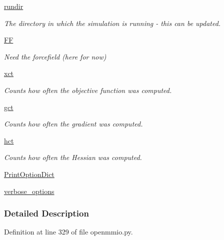 \begin{DoxyCompactItemize}
\hyperlink{classforcebalance_1_1target_1_1Target_a6872de5b2d4273b82336ea5b0da29c9e}{rundir}
\begin{DoxyCompactList}\small\item\em The directory in which the simulation is running -\/ this can be updated. \end{DoxyCompactList}\item 
\hyperlink{classforcebalance_1_1target_1_1Target_a38a37919783141ea37fdcf8b00ce0aaf}{F\-F}
\begin{DoxyCompactList}\small\item\em Need the forcefield (here for now) \end{DoxyCompactList}\item 
\hyperlink{classforcebalance_1_1target_1_1Target_aad2e385cfbf7b4a68f1c2cb41133fe82}{xct}
\begin{DoxyCompactList}\small\item\em Counts how often the objective function was computed. \end{DoxyCompactList}\item 
\hyperlink{classforcebalance_1_1target_1_1Target_aa625ac88c6744eb14ef281d9496d0dbb}{gct}
\begin{DoxyCompactList}\small\item\em Counts how often the gradient was computed. \end{DoxyCompactList}\item 
\hyperlink{classforcebalance_1_1target_1_1Target_a5b5a42f78052b47f29ed4b940c6111a1}{hct}
\begin{DoxyCompactList}\small\item\em Counts how often the Hessian was computed. \end{DoxyCompactList}\item 
\hyperlink{classforcebalance_1_1BaseClass_afc6659278497d7245bc492ecf405ccae}{Print\-Option\-Dict}
\item 
\hyperlink{classforcebalance_1_1BaseClass_afd68efa29ccd2f320f4cf82198214aac}{verbose\-\_\-options}
\end{DoxyCompactItemize}


\subsubsection{Detailed Description}


Definition at line 329 of file openmmio.\-py.



